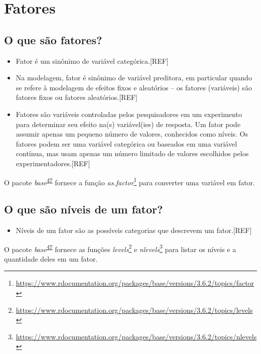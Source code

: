 \documentclass[
  a4paper,
]{book}
\providecommand{\tightlist}{%
  \setlength{\itemsep}{0pt}\setlength{\parskip}{0pt}}
\renewcommand{\href}[2]{#2\footnote{\url{#1}}}
\newenvironment{infobox}[1]
  {
  \begin{itemize}
  \renewcommand{\labelitemi}{
    \raisebox{-.7\height}[0pt][0pt]{
      {\setkeys{Gin}{width=3em,keepaspectratio}
        \texttt{[image: \#1]}}
    }
  }
  \setlength{\fboxsep}{1em}
  \begin{blackbox}
  \item
  }
  {
  \end{blackbox}
  \end{itemize}
  }
\begin{document}
\hypertarget{fatores}{%
\section{Fatores}\label{fatores}}

\hypertarget{o-que-suxe3o-fatores}{%
\subsection{O que são fatores?}\label{o-que-suxe3o-fatores}}

\begin{itemize}
\item
  Fator é um sinônimo de variável categórica.{[}REF{]}
\item
  Na modelagem, fator é sinônimo de variável preditora, em particular quando se refere à modelagem de efeitos fixos e aleatórios -- os fatores (variáveis) são fatores fixos ou fatores aleatórios.{[}REF{]}
\item
  Fatores são variáveis controladas pelos pesquisadores em um experimento para determinar seu efeito na(s) variável(ies) de resposta. Um fator pode assumir apenas um pequeno número de valores, conhecidos como níveis. Os fatores podem ser uma variável categórica ou baseados em uma variável contínua, mas usam apenas um número limitado de valores escolhidos pelos experimentadores.{[}REF{]}
\end{itemize}

\begin{infobox}{images/Rlogo}
O pacote \emph{base}\textsuperscript{\protect\hyperlink{ref-base-2}{47}} fornece a função \href{https://www.rdocumentation.org/packages/base/versions/3.6.2/topics/factor}{\emph{as.factor}} para converter uma variável em fator.

\end{infobox}

\hypertarget{o-que-suxe3o-nuxedveis-de-um-fator}{%
\subsection{O que são níveis de um fator?}\label{o-que-suxe3o-nuxedveis-de-um-fator}}

\begin{itemize}
\tightlist
\item
  Níveis de um fator são as possíveis categorias que descrevem um fator.{[}REF{]}
\end{itemize}

\begin{infobox}{images/Rlogo}
O pacote \emph{base}\textsuperscript{\protect\hyperlink{ref-base-2}{47}} fornece as funções \href{https://www.rdocumentation.org/packages/base/versions/3.6.2/topics/levels}{\emph{levels}} e \href{https://www.rdocumentation.org/packages/base/versions/3.6.2/topics/nlevels}{\emph{nlevels}} para listar os níveis e a quantidade deles em um fator.

\end{infobox}
\end{document}
